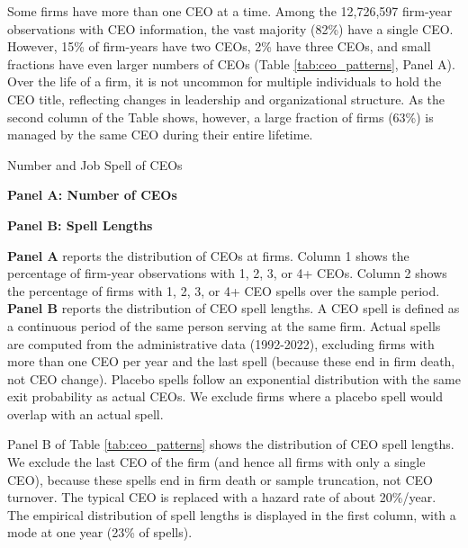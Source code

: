 \documentclass[11pt,a4paper]{article}
\begin{document}


Some firms have more than one CEO at a time. Among the 12,726,597 firm-year observations with CEO information, the vast majority (82\%) have a single CEO. However, 15\% of firm-years have two CEOs, 2\% have three CEOs, and small fractions have even larger numbers of CEOs (Table \ref{tab:ceo_patterns}, Panel A). Over the life of a firm, it is not uncommon for multiple individuals to hold the CEO title, reflecting changes in leadership and organizational structure. As the second column of the Table shows, however, a large fraction of firms (63\%) is managed by the same CEO during their entire lifetime.

\begin{table}[htbp]
\centering
\caption{Number and Job Spell of CEOs}
\label{tab:ceo_patterns}
\begin{minipage}{0.48\textwidth}
\centering
\textbf{Panel A: Number of CEOs}

\end{minipage}
\hfill
\begin{minipage}{0.48\textwidth}
\centering
\textbf{Panel B: Spell Lengths}

\end{minipage}
\begin{tablenotes}[flushleft]
\footnotesize
\item\textbf{Panel A} reports the distribution of CEOs at firms. Column 1 shows the percentage of firm-year observations with 1, 2, 3, or 4+ CEOs. Column 2 shows the percentage of firms with 1, 2, 3, or 4+ CEO spells over the sample period. \textbf{Panel B} reports the distribution of CEO spell lengths. A CEO spell is defined as a continuous period of the same person serving at the same firm.
Actual spells are computed from the administrative data (1992-2022), excluding firms with more than one CEO per year and the last spell (because these end in firm death, not CEO change). Placebo spells follow an exponential distribution with the same exit probability as actual CEOs. We exclude firms where a placebo spell would overlap with an actual spell.
\end{tablenotes}
\end{table}

Panel B of Table \ref{tab:ceo_patterns} shows the distribution of CEO spell lengths. We exclude the last CEO of the firm (and hence all firms with only a single CEO), because these spells end in firm death or sample truncation, not CEO turnover. The typical CEO is replaced with a hazard rate of about 20\%/year. The empirical distribution of spell lengths is displayed in the first column, with a mode at one year (23\% of spells).
\end{document}
